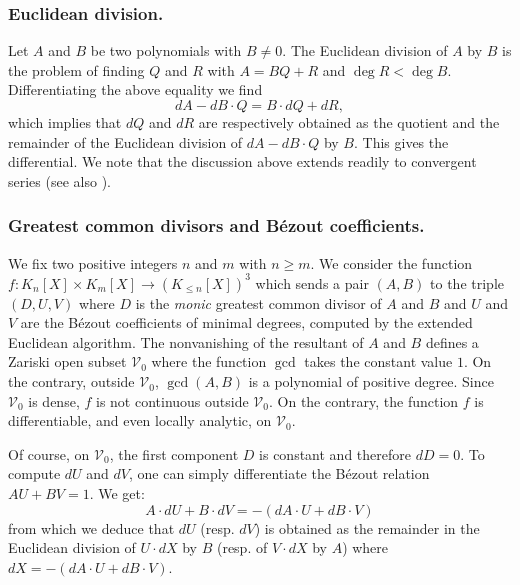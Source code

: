 \documentclass{lms}
\begin{document}
\subsubsection*{Euclidean division.}

Let $A$ and $B$ be two polynomials with $B \neq 0$. The Euclidean division of 
$A$ by $B$ is the problem of finding $Q$ and $R$ with $A = BQ + R$ and $\deg R < \deg B$. 
Differentiating the above equality we find
\[
dA - dB \cdot Q = B \cdot dQ + dR,
\]
which implies that $dQ$ and $dR$ are respectively obtained as the 
quotient and the remainder of the Euclidean division of $dA - dB \cdot 
Q$ by $B$. This gives the differential. We note that the discussion 
above extends readily to convergent series (see also 
\cite{caruso-lubicz:14a}).

\subsubsection*{Greatest common divisors and B\'ezout coefficients.}

We fix two positive integers $n$ and $m$ with $n \geq m$. We consider the 
function $f : K_n[X] \times K_m[X] \to (K_{\leq n}[X])^3$ which sends a 
pair $(A,B)$ to the triple $(D, U, V)$ where $D$ is the \emph{monic} 
greatest common divisor of $A$ and $B$ and $U$ and $V$ are the B\'ezout 
coefficients of minimal degrees, computed by the extended 
Euclidean algorithm.
The nonvanishing of the resultant of $A$ and $B$ defines a Zariski open 
subset $\mathcal V_0$ where the function $\gcd$ takes the constant value 
$1$. On the contrary, outside $\mathcal V_0$, $\gcd(A,B)$ is a polynomial 
of positive degree.  Since $\mathcal V_0$ is dense, $f$ is not continuous outside 
$\mathcal V_0$. On the contrary, the function $f$ is differentiable, and even locally analytic,
on $\mathcal V_0$.

Of course, on $\mathcal V_0$, the first component $D$ is constant and 
therefore $dD = 0$. To compute $dU$ and $dV$, one can simply 
differentiate the B\'ezout relation $AU + BV = 1$. We get:
$$A \cdot dU + B \cdot dV = - (dA \cdot U + dB \cdot V)$$
from which we deduce that $dU$ (resp. $dV$) is obtained as the 
remainder in the Euclidean division of $U{\cdot}dX$ by $B$ (resp. of 
$V{\cdot}dX$ by $A$) where $dX = - (dA \cdot U + dB \cdot V)$.
\end{document}
